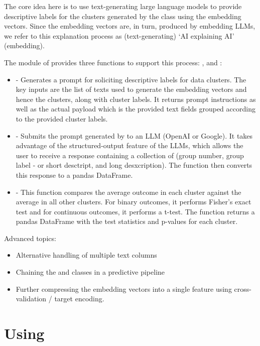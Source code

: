 \documentclass[article]{jss}
\begin{document}
The core idea here is to use text-generating large language models to provide descriptive labels for the clusters generated by the  class using the embedding vectors. Since the embedding vectors are, in turn, produced by embedding LLMs, we refer to this explanation process as (text-generating) `AI explaining AI' (embedding).

The  module of  provides three functions to support this process: ,  and :
\begin{itemize}
  \item \textbf{} - Generates a prompt for soliciting descriptive labels for data clusters. The key inputs are the list of texts used to generate the embedding vectors and hence the clusters, along with cluster labels. It returns prompt instructions as well as the actual payload which is the provided text fields grouped according to the provided cluster labels.
  \item \textbf{} - Submits the prompt generated by  to an LLM (OpenAI or Google). It takes advantage of the structured-output feature of the LLMs, which allows the user to receive a response containing a collection of (group number, group label - or short desctript, and long desxcription). The function then converts this response to a pandas DataFrame.
  \item \textbf{} - This function compares the average outcome in each cluster against the average in all other clusters. For binary outcomes, it performs Fisher's exact test and for continuous outcomes, it performs a t-test. The function returns a pandas DataFrame with the test statistics and p-values for each cluster.
\end{itemize}

Advanced topics:
\begin{itemize}
  \item Alternative handling of multiple text columns
  \item Chaining the  and  classes in a predictive pipeline
  \item Further compressing the embedding vectors into a single feature using cross-validation / target encoding.
\end{itemize}

\section[Using TabuLLM]{Using }\label{sec:usage}
\end{document}
